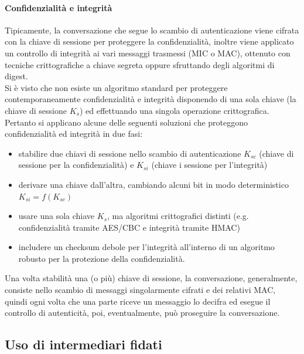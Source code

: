 \paragraph{Confidenzialità e integrità}
Tipicamente, la conversazione che segue lo scambio di autenticazione viene cifrata con la chiave di sessione per proteggere la confidenzialità, inoltre viene applicato un controllo di integrità ai vari messaggi trasmessi (MIC o MAC), ottenuto con tecniche crittografiche a chiave segreta oppure sfruttando degli algoritmi di digest.\\
Si è visto che non esiste un algoritmo standard per proteggere contemporaneamente confidenzialità e integrità disponendo di una sola chiave (la chiave di sessione $K_{s}$) ed effettuando una singola operazione crittografica. Pertanto si applicano alcune delle seguenti soluzioni che proteggono confidenzialità ed integrità in due fasi:
\begin{itemize}
	\item stabilire due chiavi di sessione nello scambio di autenticazione $K_{sc}$ (chiave di sessione per la confidenzialità) e $K_{si}$ (chiave i sessione per l'integrità)
	\item derivare una chiave dall'altra, cambiando alcuni bit in modo deterministico $K_{si} = f(K_{sc})$
	\item usare una sola chiave $K_{s}$, ma algoritmi crittografici distinti (e.g. confidenzialità tramite AES/CBC e integrità tramite HMAC)
	\item includere un checksum debole per l'integrità all'interno di un algoritmo robusto per la protezione della confidenzialità. 
\end{itemize}
Una volta stabilità una (o più) chiave di sessione, la conversazione, generalmente, consiste nello scambio di messaggi singolarmente cifrati e dei relativi MAC, quindi ogni volta che una parte riceve un messaggio lo decifra ed esegue il controllo di autenticità, poi, eventualmente, può proseguire la conversazione.

\subsection{Uso di intermediari fidati}
